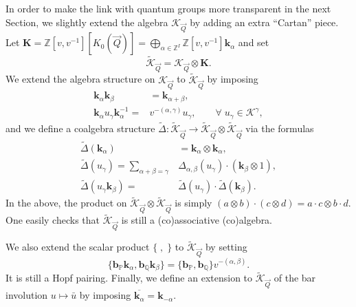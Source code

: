 \documentclass[a4paper,10pt]{amsart}
\def\Z{\mathbb{Z}}
\def\a{\alpha}
\numberwithin{equation}{section}
\begin{document}
In order to make the link with quantum groups more transparent in the next Section, we slightly extend the algebra $\mathcal{K}_{\vec{Q}}$ by adding an extra ``Cartan'' piece. Let $\mathbf{K}=\Z[v,v^{-1}] [K_0(\vec{Q})]=\bigoplus_{\a \in \Z^I} \Z[v,v^{-1}] \mathbf{k}_{\a}$ and set
$$\widetilde{\mathcal{K}}_{\vec{Q}} =\mathcal{K}_{\vec{Q}} \otimes \mathbf{K}.$$
We extend the algebra structure on $\mathcal{K}_{\vec{Q}}$ to $\widetilde{\mathcal{K}}_{\vec{Q}}$ by imposing
\begin{equation}\label{E:drtyu}
\begin{split}
\mathbf{k}_{\a} \mathbf{k}_{\beta}&=\mathbf{k}_{\a+\beta},\\
\mathbf{k}_{\a} u_{\gamma} \mathbf{k}^{-1}_{\a}=&v^{-(\a,\gamma)} u_{\gamma}, \qquad \forall\; u_{\gamma} \in \mathcal{K}^{\gamma},
\end{split}
\end{equation}
and we define a coalgebra structure $\widetilde{\Delta}: \widetilde{\mathcal{K}}_{\vec{Q}} \to \widetilde{\mathcal{K}}_{\vec{Q}} \otimes \widetilde{\mathcal{K}}_{\vec{Q}}$ via the formulas
\begin{equation}\label{E:DeltaK}
\begin{split}
\widetilde{\Delta}(\mathbf{k}_{\a})&=\mathbf{k}_{\a} \otimes \mathbf{k}_{\a},\\
\widetilde{\Delta} (u_{\gamma})=\sum_{\a+\beta=\gamma} &\Delta_{\a,\beta}(u_{\gamma}) \cdot (\mathbf{k}_{\beta} \otimes 1),\\
\widetilde{\Delta}(u_{\gamma} \mathbf{k}_{\beta})=&\widetilde{\Delta}(u_{\gamma}) \cdot \widetilde{\Delta}(\mathbf{k}_{\beta}).
\end{split}
\end{equation}
In the above, the product on $\widetilde{\mathcal{K}}_{\vec{Q}} \otimes \widetilde{\mathcal{K}}_{\vec{Q}}$ is simply $(a \otimes b) \cdot (c \otimes d)=a \cdot c \otimes b \cdot d$. One easily checks that $\widetilde{\mathcal{K}}_{\vec{Q}}$ is still a (co)associative (co)algebra.

We also extend the scalar product $\{\;,\;\}$ to $\widetilde{\mathcal{K}}_{\vec{Q}}$ by setting
\begin{equation}\label{E:22new}
\{\mathbf{b}_{\mathbb{P}}\mathbf{k}_{\a},\mathbf{b}_{\mathbb{Q}}\mathbf{k}_{\beta}\}=\{\mathbf{b}_{\mathbb{P}},\mathbf{b}_{\mathbb{Q}}\} v^{-(\a,\beta)}.
\end{equation}
It is still a Hopf pairing. Finally, we define an extension to $\widetilde{\mathcal{K}}_{\vec{Q}}$ of the bar involution $u \mapsto \bar{u}$ by imposing
$\overline{\mathbf{k}_\a}=\mathbf{k}_{-\a}$.
\end{document}
